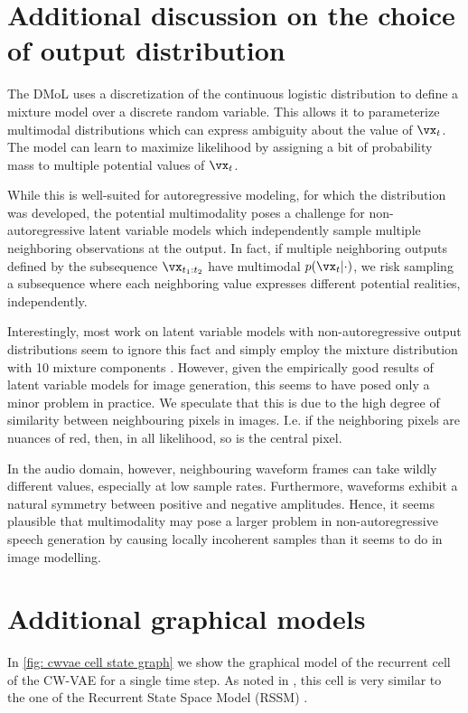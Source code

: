 \section{Additional discussion on the choice of output distribution}\label{app: additional discussion on output distribution}
The DMoL uses a discretization of the continuous logistic distribution to define a mixture model over a discrete random variable. This allows it to parameterize multimodal distributions which can express ambiguity about the value of $\vx_t$.
The model can learn to maximize likelihood by assigning a bit of probability mass to multiple potential values of $\vx_t$.

While this is well-suited for autoregressive modeling, for which the distribution was developed, the potential multimodality poses a challenge for non-autoregressive latent variable models which independently sample multiple neighboring observations at the output.
In fact, if multiple neighboring outputs defined by the subsequence $\vx_{t_1:t_2}$ have multimodal $p(\vx_t|\cdot)$, we risk sampling a subsequence where each neighboring value expresses different potential realities, independently. 

Interestingly, most work on latent variable models with non-autoregressive output distributions seem to ignore this fact and simply employ the mixture distribution with 10 mixture components \cite{maaloe_biva_2019, vahdat_nvae_2020, child_very_2021}.
However, given the empirically good results of latent variable models for image generation, this seems to have posed only a minor problem in practice. We speculate that this is due to the high degree of similarity between neighbouring pixels in images. I.e. if the neighboring pixels are nuances of red, then, in all likelihood, so is the central pixel.

In the audio domain, however, neighbouring waveform frames can take wildly different values, especially at low sample rates. Furthermore, waveforms exhibit a natural symmetry between positive and negative amplitudes.
Hence, it seems plausible that multimodality may pose a larger problem in non-autoregressive speech generation by causing locally incoherent samples than it seems to do in image modelling.


\section{Additional graphical models}\label{app: additional graphical models}
In \cref{fig: cwvae cell state graph} we show the graphical model of the recurrent cell of the CW-VAE for a single time step. As noted in \cite{saxena_clockwork_2021}, this cell is very similar to the one of the Recurrent State Space Model (RSSM) \cite{hafner_learning_2019}.

